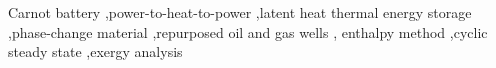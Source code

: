 \documentclass[preprint,12pt]{elsarticle}
\begin{document}
\begin{frontmatter}
\begin{keyword}
Carnot battery \sep power-to-heat-to-power \sep latent heat thermal energy
storage \sep phase-change material \sep repurposed oil and gas wells \sep
enthalpy method \sep cyclic steady state \sep exergy analysis
\end{keyword}

\end{frontmatter}









\end{document}

